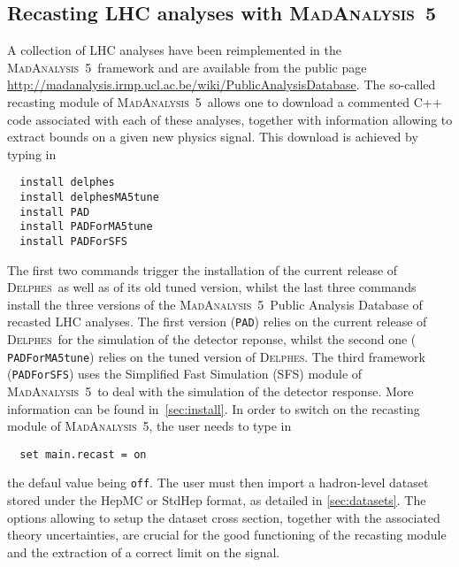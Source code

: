 \documentclass[a4paper]{article}
\newcommand{\MA}{\textsc{MadAnalysis}~5}
\newcommand{\DEL}{\textsc{Delphes}}
\begin{document}
\begin{shaded}
\section{\Large Recasting LHC analyses with \MA}
\end{shaded}
A collection of LHC analyses have been reimplemented in the \MA\ framework and
are available from the public page
\href{http://madanalysis.irmp.ucl.ac.be/wiki/PublicAnalysisDatabase}
{http://madanalysis.irmp.ucl.ac.be/wiki/PublicAnalysisDatabase}. The so-called
recasting module of \MA\ allows one to download a commented C++ code associated
with each of these analyses, together with information allowing to extract
bounds on a given new physics signal. This download is achieved by typing in
{\color{ao} \begin{verbatim}
  install delphes
  install delphesMA5tune
  install PAD
  install PADForMA5tune
  install PADForSFS
\end{verbatim}}
\noindent The first two commands trigger the installation of the current release
of \DEL\ as well as of its old tuned version, whilst the last three commands
install the three versions of the \MA\ Public Analysis Database of recasted LHC
analyses. The first version ({\tt PAD}) relies on the current release of \DEL\
for the simulation of the detector reponse, whilst the second one ({\tt
PADForMA5tune}) relies on the
tuned version of \DEL. The third framework ({\tt PADForSFS}) uses the Simplified
Fast Simulation (SFS) module of \MA\ to deal with the simulation of the
detector response. More information can be found in~\autoref{sec:install}.
In order to switch on the recasting module of \MA, the user needs to type in
{\color{ao} \begin{verbatim}
  set main.recast = on
\end{verbatim}}
\noindent the defaul value being \verb|off|. The user must then import a
hadron-level dataset stored under the HepMC or StdHep format, as detailed in
\autoref{sec:datasets}. The options allowing to setup the dataset cross section,
together with the associated theory uncertainties, are crucial for
the good functioning of the recasting module and the extraction of a correct
limit on the signal.
\end{document}

